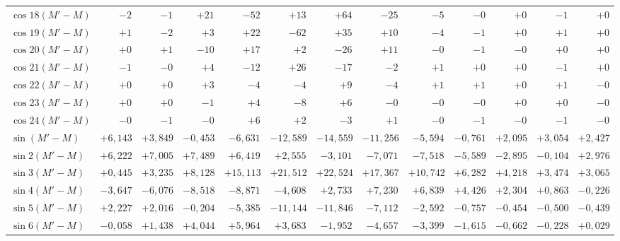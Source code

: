 \begin{landscape}
\begin{longtable}{@{}l|r|r|r|r|r|r|r|r|r|r|r|r@{}}
\(\cos 18(M'-M)\) & \(-2\) & \(-1\) & \(+21\) & \(-52\) & \(+13\) & \(+64\) & \(-25\) & \(-5\) & \(-0\) & \(+0\) & \(-1\) & \(+0\)\\
\(\cos 19(M'-M)\) & \(+1\) & \(-2\) & \(+3\) & \(+22\) & \(-62\) & \(+35\) & \(+10\) & \(-4\) & \(-1\) & \(+0\) & \(+1\) & \(+0\)\\
\(\cos 20(M'-M)\) & \(+0\) & \(+1\) & \(-10\) & \(+17\) & \(+2\) & \(-26\) & \(+11\) & \(-0\) & \(-1\) & \(-0\) & \(+0\) & \(+0\)\\
\(\cos 21(M'-M)\) & \(-1\) & \(-0\) & \(+4\) & \(-12\) & \(+26\) & \(-17\) & \(-2\) & \(+1\) & \(+0\) & \(+0\) & \(-1\) & \(+0\)\\
\(\cos 22(M'-M)\) & \(+0\) & \(+0\) & \(+3\) & \(-4\) & \(-4\) & \(+9\) & \(-4\) & \(+1\) & \(+1\) & \(+0\) & \(+1\) & \(-0\)\\
\(\cos 23(M'-M)\) & \(+0\) & \(+0\) & \(-1\) & \(+4\) & \(-8\) & \(+6\) & \(-0\) & \(-0\) & \(-0\) & \(+0\) & \(+0\) & \(-0\)\\
\(\cos 24(M'-M)\) & \(-0\) & \(-1\) & \(-0\) & \(+6\) & \(+2\) & \(-3\) & \(+1\) & \(-0\) & \(-1\) & \(-0\) & \(-1\) & \(-0\)\\[6pt]
\(\sin(M'-M)\) & \(+6{,}143\) & \(+3{,}849\) & \(-0{,}453\) & \(-6{,}631\) & \(-12{,}589\) & \(-14{,}559\) & \(-11{,}256\) & \(-5{,}594\) & \(-0{,}761\) & \(+2{,}095\) & \(+3{,}054\) & \(+2{,}427\)\\
\(\sin 2(M'-M)\) & \(+6{,}222\) & \(+7{,}005\) & \(+7{,}489\) & \(+6{,}419\) & \(+2{,}555\) & \(-3{,}101\) & \(-7{,}071\) & \(-7{,}518\) & \(-5{,}589\) & \(-2{,}895\) & \(-0{,}104\) & \(+2{,}976\)\\
\(\sin 3(M'-M)\) & \(+0{,}445\) & \(+3{,}235\) & \(+8{,}128\) & \(+15{,}113\) & \(+21{,}512\) & \(+22{,}524\) & \(+17{,}367\) & \(+10{,}742\) & \(+6{,}282\) & \(+4{,}218\) & \(+3{,}474\) & \(+3{,}065\)\\
\(\sin 4(M'-M)\) & \(-3{,}647\) & \(-6{,}076\) & \(-8{,}518\) & \(-8{,}871\) & \(-4{,}608\) & \(+2{,}733\) & \(+7{,}230\) & \(+6{,}839\) & \(+4{,}426\) & \(+2{,}304\) & \(+0{,}863\) & \(-0{,}226\)\\
\(\sin 5(M'-M)\) & \(+2{,}227\) & \(+2{,}016\) & \(-0{,}204\) & \(-5{,}385\) & \(-11{,}144\) & \(-11{,}846\) & \(-7{,}112\) & \(-2{,}592\) & \(-0{,}757\) & \(-0{,}454\) & \(-0{,}500\) & \(-0{,}439\)\\
\(\sin 6(M'-M)\) & \(-0{,}058\) & \(+1{,}438\) & \(+4{,}044\) & \(+5{,}964\) & \(+3{,}683\) & \(-1{,}952\) & \(-4{,}657\) & \(-3{,}399\) & \(-1{,}615\) & \(-0{,}662\) & \(-0{,}228\) & \(+0{,}029\)\\

\end{longtable}
\end{landscape}
